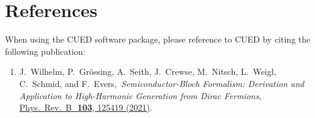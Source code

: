 \documentclass[11pt, a4paper]{scrartcl}
\newcommand{\paper}[4]{\item #1, \,\textit{#2}, \,\href{#3}{#4}.\\[-1.4em]}
\begin{document}
\section{References}
When using the CUED software package, please reference to CUED by citing the following publication:
\begin{enumerate}[leftmargin=*]

\paper{J.~Wilhelm, P.~Grössing, A.~Seith, J.~Crewse, M.~Nitsch, L.~Weigl, C.~Schmid, and F.~Evers}{Semi\-con\-duc\-tor-Bloch Formalism: Derivation and Application to High-Harmonic Generation from Dirac Fermions}{https://doi.org/10.1103/PhysRevB.103.125419}{ 
Phys.~Rev.~B~\,\textbf{103}, 125419 (2021)}
\label{Wilhelm2021}

\end{enumerate}
\end{document}
